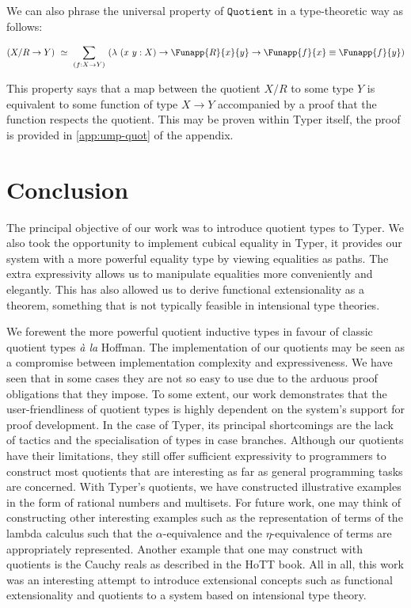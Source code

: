 \documentclass[12pt,twoside,maitrise]{dms}
\theoremstyle{definition}
\numberwithin{equation}{section}
\numberwithin{table}{chapter}
\numberwithin{figure}{chapter}
\newcommand\id[1] {\texttt{#1}}
\newcommand\latinphrase{\textit}
\begin{document}
We can also phrase the universal property of $\id{Quotient}$ in a type-theoretic
way as follows:

\begin{align*}
  & (X/R \rightarrow Y) \ \simeq \ \sum\limits_{(\oftype{f}{X \rightarrow Y})} \ (\lambda \ (x \ y : X) \rightarrow \Funapp{R}{x}{y} \rightarrow \Funapp{f}{x} \equiv \Funapp{f}{y}) \\
\end{align*}

This property says that a map between the quotient $X / R$ to some type $Y$ is
equivalent to some function of type $X \rightarrow Y$ accompanied by a
proof that the function respects the quotient. This may be proven within Typer
itself, the proof is provided in \autoref{app:ump-quot} of the appendix.

\chapter{Conclusion}

The principal objective of our work was to introduce quotient types to Typer.
We also took the opportunity to implement cubical equality in Typer, it
provides our system with a more powerful equality type by viewing equalities as
paths. The extra expressivity allows us to manipulate equalities more
conveniently and elegantly. This has also allowed us to derive functional
extensionality as a theorem, something that is not typically feasible in
intensional type theories.

We forewent the more powerful quotient inductive types in favour of classic
quotient types \latinphrase{à la} Hoffman. The implementation of our quotients
may be seen as a compromise between implementation complexity and
expressiveness. We have seen that in some cases they are not so easy to use due
to the arduous proof obligations that they impose. To some extent, our work
demonstrates that the user-friendliness of quotient types is highly dependent on
the system's support for proof development. In the case of Typer, its principal
shortcomings are the lack of tactics and the specialisation of types in case
branches. Although our quotients have their limitations, they still offer
sufficient expressivity to programmers to construct most quotients that are
interesting as far as general programming tasks are concerned. With Typer's
quotients, we have constructed illustrative examples in the form of rational
numbers and multisets. For future work, one may think of constructing other
interesting examples such as the representation of terms of the lambda calculus
such that the $\alpha$-equivalence and the $\eta$-equivalence of terms are
appropriately represented. Another example that one may construct with quotients
is the Cauchy reals as described in the HoTT book\cite[Chap. 11.3.1]{HoTTbook}.
All in all, this work was an interesting attempt to introduce extensional
concepts such as functional extensionality and quotients to a system based on
intensional type theory.
\end{document}
